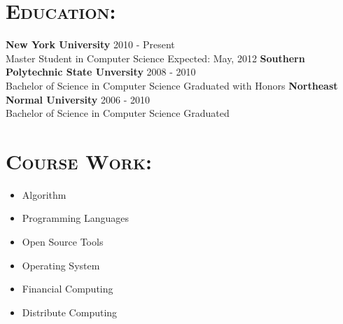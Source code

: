 \begin{resume}




\section{\textsc{Education:}}

\textbf{\newline New York University} \hfill 2010 - Present \\
Master Student in Computer Science \hfill Expected: May, 2012
\newline
\textbf{Southern Polytechnic State Unversity} \hfill 2008 - 2010 \\ 
Bachelor of Science in Computer Science \hfill Graduated with Honors
\newline
\textbf{Northeast Normal University} \hfill 2006 - 2010 \\
Bachelor of Science in Computer Science \hfill Graduated


\section{\textsc{Course Work:}}

\begin{multicols}{2}
\begin{itemize}
    \item Algorithm
    \item Programming Languages
    \item Open Source Tools
    \item Operating System
    \item Financial Computing 
    \item Distribute Computing
\end{itemize}
\end{multicols}



\end{resume}
